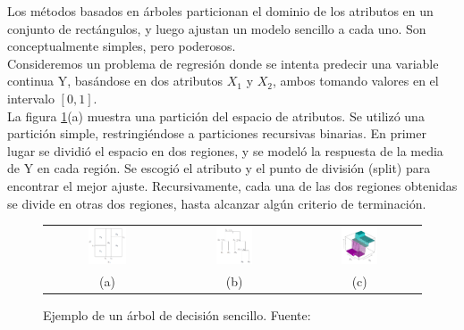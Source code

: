 Los métodos basados en árboles particionan el dominio de los atributos en un conjunto de rectángulos, y luego ajustan un modelo sencillo a cada uno. Son conceptualmente simples, pero poderosos.\\

Consideremos un problema de regresión donde se intenta predecir una variable continua Y, basándose en dos atributos $X_1$ y $X_2$, ambos tomando valores en el intervalo $[0,1]$. \\

La figura \ref{fig:arboles_hastie_1}(a) muestra una partición del espacio de atributos. Se utilizó una partición simple, restringiéndose a particiones recursivas binarias. En primer lugar se dividió el espacio en dos regiones, y se modeló la respuesta de la media de Y en cada región. Se escogió el atributo y el punto de división (split) para encontrar el mejor ajuste. Recursivamente, cada una de las dos regiones obtenidas se divide en otras dos regiones, hasta alcanzar algún criterio de terminación. \\

\begin{figure}[h!]
\begin{tabular}{ccc}
  \includegraphics[width=0.32\textwidth]{Kap1/cart1.png} &     \includegraphics[width=0.32\textwidth]{Kap1/cart2.png} &
    \includegraphics[width=0.32\textwidth]{Kap1/cart3.png}
    \\
(a)  & (b) & (c) 
\end{tabular}
\caption{Ejemplo de un árbol de decisión sencillo. Fuente: \protect\cite{statisticallearning} }
\label{fig:arboles_hastie_1}
\end{figure}

